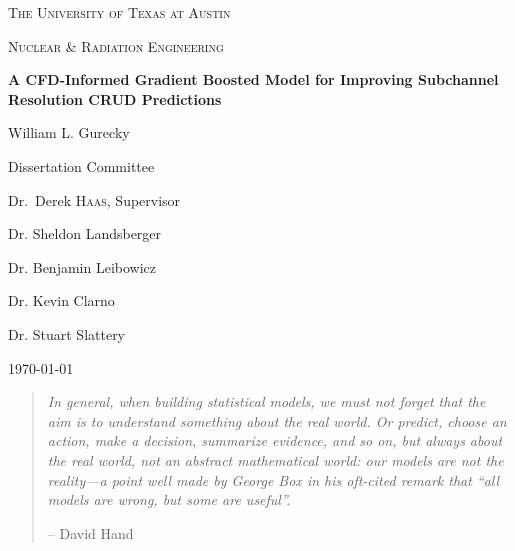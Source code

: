 
\begin{titlepage}
	\centering
	{\scshape\LARGE The University of Texas at Austin \par}
	\vspace{1cm}
	{\scshape\Large Nuclear \& Radiation Engineering \par}
	\vspace{1.5cm}
	{\huge\bfseries A CFD-Informed Gradient Boosted Model for Improving Subchannel Resolution CRUD Predictions\par}
	\vspace{2cm}
	{\Large William L. Gurecky \par}
	\vfill

	\begin{flushright}
	Dissertation Committee \par
	\bigskip
	Dr.~Derek \textsc{Haas}, Supervisor \par
	Dr. Sheldon Landsberger \par
	Dr. Benjamin Leibowicz \par
	Dr. Kevin Clarno \par
	Dr. Stuart Slattery \par
	\end{flushright}
	\vfill
	{\large \today\par}
\end{titlepage}
\pagebreak
\tableofcontents
\pagebreak

\clearpage
\vspace*{\fill}
\thispagestyle{empty} %
\begin{quotation}
\em %
In general, when building statistical models, we must not forget that the aim is to understand something about the real world. Or predict, choose an action, make a decision, summarize evidence, and so on, but always about the real world, not an abstract mathematical world: our models are not the reality—a point well made by George Box in his oft-cited remark that “all models are wrong, but some are useful”.
\medskip

--  David Hand
\end{quotation}
\vspace*{\fill}

\pagebreak
